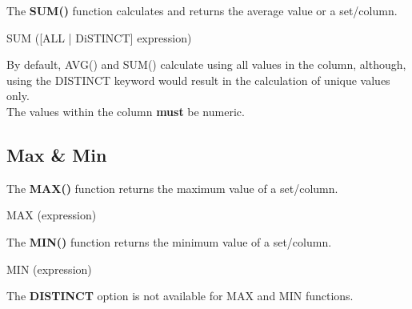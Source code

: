 The \textbf{SUM()} function calculates and returns the average value or a set/column.

\begin{center}
    SUM ([ALL | DiSTINCT] expression)
\end{center}

By default, AVG() and SUM() calculate using all values in the column, although, using the DISTINCT keyword would result in the calculation of unique values only.\\
The values within the column \textbf{must} be numeric.


\subsection{Max \& Min}
The \textbf{MAX()} function returns the maximum value of a set/column.

\begin{center}
    MAX (expression)
\end{center}

The \textbf{MIN()} function returns the minimum value of a set/column.

\begin{center}
    MIN (expression)
\end{center}

The \textcolor{textgray}{\textbf{DISTINCT}} option is not available for MAX and MIN functions.

